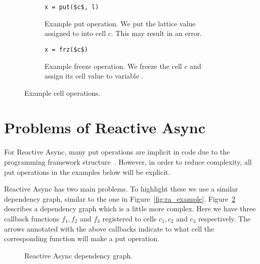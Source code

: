 \begin{figure}
  \centering
  \begin{subfigure}[t]{0.4\textwidth}
    \begin{lstlisting}[numbers=none,mathescape=true]
x = put($c$, l)
    \end{lstlisting}
    \caption{Example put operation. We put the lattice value assigned to  into
    cell $c$. This may result in an error.}
  \end{subfigure}
  \quad
  \begin{subfigure}[t]{0.4\textwidth}
    \begin{lstlisting}[numbers=none,mathescape=true]
x = frz($c$)
    \end{lstlisting}
    \caption{Example freeze operation. We freeze the cell $c$ and assign its cell
    value to variable .}
  \end{subfigure}
  \caption{Example cell operations.}
  \label{fig:ex_cell_op}
\end{figure}

\section{Problems of Reactive Async}%
\label{sec:problems_of_reactive_async}

For Reactive Async, many put operations are implicit in code due to the
programming framework structure~\parencite{conf/scala/HallerGES16}. However, in
order to reduce complexity, all put operations in the examples below will be
explicit.

Reactive Async has two main problems. To highlight these we use a similar
dependency graph, similar to the one in Figure~\ref{fig:ra_example}.
Figure~\ref{fig:ra_example2} describes a dependency graph which is a little more
complex. Here we have three callback functions $f_1, f_2$ and $f_3$ registered
to cells $c_1, c_2$ and $c_3$ respectively. The arrows annotated with the above
callbacks indicate to what cell the corresponding function will make a
put operation.

\begin{figure}
  \centering
  \caption{Reactive Async dependency graph.}
  \label{fig:ra_example2}
\end{figure}

